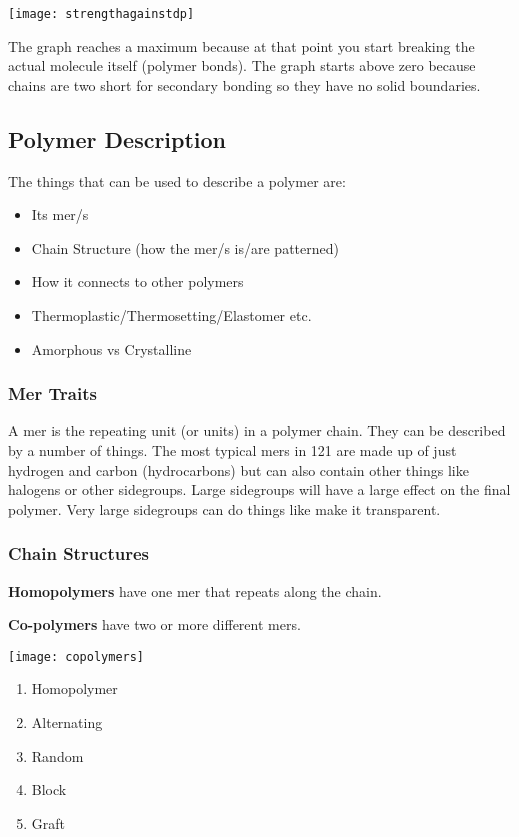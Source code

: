 \documentclass[12pt]{article}
\begin{document}
\texttt{[image: strengthagainstdp]}

The graph reaches a maximum because at that point you start breaking the actual molecule itself (polymer bonds).
The graph starts above zero because chains are two short for secondary bonding so they have no solid boundaries.

\subsection{Polymer Description}
The things that can be used to describe a polymer are: 
\begin{itemize}
  \item Its mer/s
  \item Chain Structure (how the mer/s is/are patterned) 
  \item How it connects to other polymers
  \item Thermoplastic/Thermosetting/Elastomer etc.
  \item Amorphous vs Crystalline 
\end{itemize}

\subsubsection{Mer Traits}
A mer is the repeating unit (or units) in a polymer chain. 
They can be described by a number of things.
The most typical mers in 121 are made up of just hydrogen and carbon (hydrocarbons) but can also contain other things like halogens or other sidegroups.
Large sidegroups will have a large effect on the final polymer. 
Very large sidegroups can do things like make it transparent.

\subsubsection{Chain Structures}
\textbf{Homopolymers} have one mer that repeats along the chain.

\textbf{Co-polymers} have two or more different mers.


\begin{multicols}{2}
  \texttt{[image: copolymers]}
\begin{enumerate}
  \item Homopolymer
  \item Alternating 
  \item Random 
  \item Block 
  \item Graft
\end{enumerate}
\end{multicols}
\end{document}

